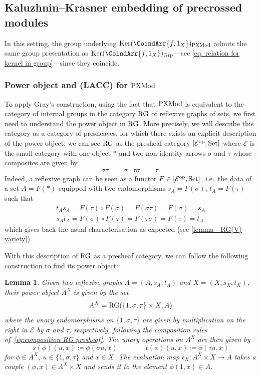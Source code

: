 \documentclass[a4paper, british, reqno]{amsart}
\newcommand*{\from}{\colon}
\newcommand*{\eqdef}{\coloneq}
\newcommand*{\opp}[1]{{#1}^{\operatorfont op}}
\DeclareMathOperator{\Ker}{Ker} %
\renewcommand*{\and}{,}
\renewcommand*{\and}{,}
\newcommand*{\CatSymb}[1]{\mathcal{#1}}
\newcommand*{\CatName}[1]{\textnormal{#1}}
\newcommand*{\CondName}[1]{\textnormal{(#1)}}
\newcommand*{\E}{\CatSymb{E}}
\newcommand*{\Grp}{\CatName{Grp}}
\newcommand*{\PXMod}{\CatName{PXMod}}
\newcommand*{\RG}{\CatName{RG}}
\newcommand*{\Set}{\CatName{Set}}
\newcommand*{\LACC}{\CondName{LACC}}
\newtheorem{lemma}[theorem]{Lemma}
\theoremstyle{definition}
\theoremstyle{remark}
\begin{document}
\subsection{Kaluzhnin--Krasner embedding of precrossed modules}
\label{sec:KK PXMod}
In this setting, the group underlying \(\Ker(\CoindArr{f\and 1_X})_{\PXMod}\) admits the same group presentation as \(\Ker(\CoindArr{f\and 1_X})_{\Grp}\)---see \eqref{eq: relation for kernel in group}---since they coincide.

\subsubsection{Power object and \LACC{} for \texorpdfstring{\(\PXMod\)}{PXMod}}\label{subsubsec - power object in PXMod}

To apply Gray's construction, using the fact that \(\PXMod\) is equivalent to the category of internal groups in the category \(\RG\) of reflexive graphs of sets, we first need to understand the power object in \(\RG\). More precisely, we will describe this category as a category of presheaves, for which there exists an explicit description of the power object: we can see \(\RG\) as the presheaf category \([\opp{\E}, \Set]\) where \(\E\) is the small category with one object \(\ast\) and two non-identity arrows \(\sigma\) and \(\tau\) whose composites are given by
\begin{align}
	\label{eq:composition RG presheaf}
	\sigma \tau & = \sigma & \tau \sigma & = \tau\text{.}
\end{align}
Indeed, a reflexive graph can be seen as a functor \(F\in  [\opp{\E}, \Set]\), i.e.\ the data of a set \(A = F(\ast)\) equipped with two endomorphisms \(s_A = F(\sigma)\), \(t_A = F(\tau)\) such that
\begin{gather*}
	t_A s_A = F(\tau)\circ F(\sigma) = F(\sigma\tau) = F(\sigma) = s_A \\
	s_A t_A = F(\sigma)\circ F(\tau) = F(\tau\sigma) = F(\tau) = t_A
\end{gather*}
which gives back the usual characterisation as expected (see \cref{lemma - RG(V) variety}).

With this description of \(\RG\) as a presheaf category, we can follow the following construction to find its power object:

\begin{lemma}
	\label{lem:exp PXMod}
	Given two reflexive graphs \(A = (A,s_A,t_A)\) and \(X = (X,s_X,t_X)\), their power object \(A^X\) is given by the set
	\[
		A^X = \RG(\{1,\sigma,\tau\} \times X,A)
	\]
	where the unary endomorphisms on \(\{1,\sigma,\tau\}\) are given by multiplication on the right in \(\E\) by \(\sigma\) and \(\tau\), respectively, following the composition rules of~\eqref{eq:composition RG presheaf}. The unary operations on \(A^X\) are then given by
	\[
		s(\phi)(u,x) \eqdef \phi(\sigma u,x) \qquad\qquad t(\phi)(u,x) \eqdef \phi(\tau u,x)
	\]
	for \(\phi \in A^X\), \(u \in \{1,\sigma,\tau\}\) and \(x \in X\). The evaluation map \(\epsilon_X \from A^X \times X \to A\) takes a couple \((\phi,x) \in A^X \times X\) and sends it to the element \(\phi(1,x) \in A\).
\end{lemma}
\end{document}
